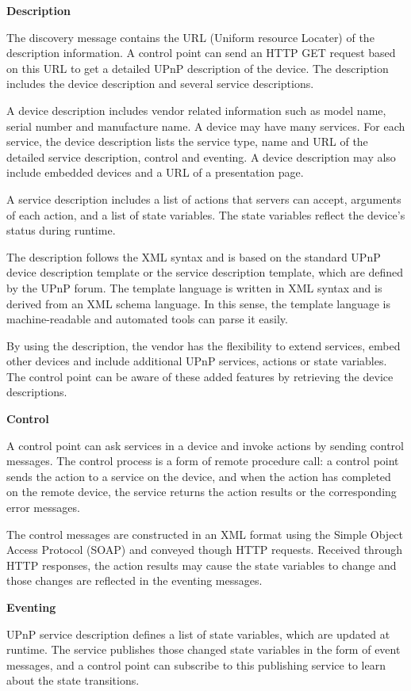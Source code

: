 \textbf{Description}

The discovery message contains the URL (Uniform resource Locater) of the
description information. A control point can send an HTTP GET request based on
this URL to get a detailed UPnP description of the device. The description includes the device description and several service descriptions. 

A device description includes vendor related information such as model name,
 serial number and manufacture name. A device may have many services. For each service, the device description lists 
the service type, name and URL of the detailed service description, control and eventing. A device 
description may also include embedded devices and a URL of a presentation
page.

A service description includes a list of actions that servers can accept, arguments of each action, 
and a list of state variables. The state variables reflect the device's status
during runtime.

The description follows the XML syntax and is based on the standard UPnP device
description template or the service description template, which are defined by
the UPnP forum. The template language is written in XML syntax and is derived from an XML schema language. In this sense, the template language is machine-readable and automated tools can parse it easily.

By using the description, the vendor has the flexibility to extend services, embed other devices and include 
additional UPnP services, actions or state variables. The control point can be
aware of these added features by retrieving the device descriptions.

\textbf{Control} 

A control point can ask services in a device and invoke actions by sending
control messages. The control process is a form of remote procedure call: a
control point sends the action to a service on the device, and when the action has completed on the remote device, the service returns the action results or the corresponding error messages.

The control messages are constructed in an XML format using the Simple Object
Access Protocol (SOAP) and conveyed though HTTP requests. Received through HTTP
responses, the action results may cause the state variables to change and those changes are reflected in the eventing messages.

\textbf{Eventing}

UPnP service description defines a list of state variables, which are updated at runtime. The service 
publishes those changed state variables in the form of event messages, and a control point can 
subscribe to this publishing service to learn about the state transitions.

